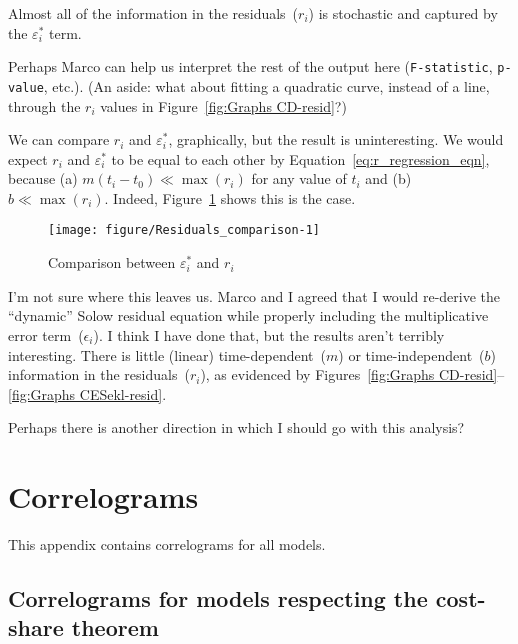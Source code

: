 \documentclass[preprint,authoryear,12pt]{elsarticle}\usepackage[]{graphicx}\usepackage[]{color}
\makeatletter
\def\maxwidth{ %
  \ifdim\Gin@nat@width>\linewidth
    \linewidth
  \else
    \Gin@nat@width
  \fi
}
\newenvironment{knitrout}{}{} %
\makeatother
\begin{document}
Almost all of the information in the residuals~($r_i$)
is stochastic and captured by the $\varepsilon_i^*$ term.

Perhaps Marco can help us interpret the rest of the
output here (\texttt{F-statistic}, \texttt{p-value}, etc.).
(An aside: what about fitting a quadratic curve,
instead of a line, 
through the $r_i$ values in Figure~\ref{fig:Graphs CD-resid}?)

We can compare $r_i$ and $\varepsilon_i^*$, graphically,
but the result is uninteresting. 
We would expect $r_i$ and $\varepsilon_i^*$
to be equal to each other by Equation~\ref{eq:r_regression_eqn}, 
because
(a) $m (t_i - t_0) \ll \max(r_i)$
for any value of $t_i$
and
(b) $b \ll \max(r_i)$.
Indeed, Figure~\ref{fig:Residuals_comparison}
shows this is the case.
%
\begin{knitrout}
\color{fgcolor}\begin{figure}[H]

{\centering \texttt{[image: figure/Residuals\_comparison-1]} 

}

\caption[Comparison between ]{Comparison between $\varepsilon_i^*$ and $r_i$}\label{fig:Residuals_comparison}
\end{figure}


\end{knitrout}
%
I'm not sure where this leaves us.
Marco and I agreed that I would re-derive the ``dynamic'' Solow residual
equation while properly including the multiplicative error term~($\epsilon_i$).
I think I have done that, but the results aren't terribly interesting.
There is little (linear) time-dependent~($m$) or 
time-independent~($b$) 
information in the residuals~($r_i$),
as evidenced by Figures~\ref{fig:Graphs CD-resid}--\ref{fig:Graphs CESekl-resid}.

Perhaps there is another direction in which I should go with this analysis?


\section{Correlograms} 
\label{sec:correlograms}

This appendix contains correlograms for all models.

\subsection{Correlograms for models respecting the cost-share theorem} 
\label{sec:correlograms_CST}
\end{document}
